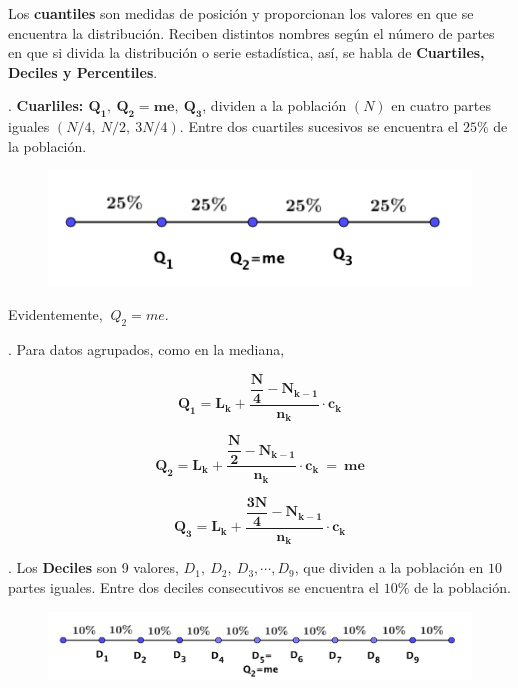 	

	Los \textbf{cuantiles} son medidas de posición y proporcionan los valores en que se encuentra la distribución.	 Reciben distintos nombres según el número de partes en que si divida la distribución o serie estadística, así, se habla de \textbf{Cuartiles, Deciles y Percentiles}.


\vspace{5mm}%
\begin{definition}
	. \textbf{Cuarliles: $\boldsymbol{ Q_1,\ Q_2=me,\ Q_3 }$}, dividen a la población $(N)$ en cuatro partes iguales $(N/4,\  N/2,\  3N/4)$. Entre dos cuartiles sucesivos se encuentra el $25\%$ de la población.
	
	\begin{figure}[H]
			\centering
			\includegraphics[width=.7\textwidth]{imagenes/imagenes01/T01IM12.png}
	\end{figure}
\end{definition}

Evidentemente, $\ Q_2=me$.

\vspace{5mm}%
\begin{theorem}
	. Para datos agrupados, como en la mediana, 
	
	$$\boxed{\ \boldsymbol{Q_1=L_k+\dfrac{\dfrac{N}{4}-N_{k-1}}{n_k}\cdot c_k} \ }$$
	
	$$\boxed{\ \boldsymbol{Q_2=L_k+\dfrac{\dfrac{N}{2}-N_{k-1}}{n_k}\cdot c_k \ = \ me}  \ } $$
	
	$$ \boxed{\ \boldsymbol{Q_3=L_k+\dfrac{\dfrac{3N}{4}-N_{k-1}}{n_k}\cdot c_k} \ }$$
\end{theorem}

\vspace{5mm}%
\begin{definition}
	. Los \textbf{Deciles} son 9 valores, $D_1,\ D_2, \ D_3,  \cdots , D_9$, que dividen a la población en $10$ partes iguales. Entre dos deciles consecutivos se encuentra el $10\%$ de la población.	
	
	\begin{figure}[H]
			\centering
			\includegraphics[width=.9\textwidth]{imagenes/imagenes01/T01IM13.png}
	\end{figure}
\end{definition}

